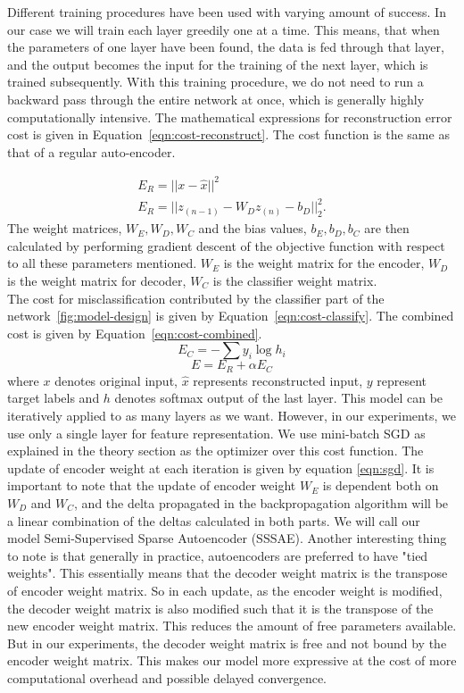 Different training procedures have been used with varying amount of success. In our case we will train each layer greedily one at a time. This means, that when the parameters of one layer have been found, the data is fed through that layer, and the output becomes the input for the training of the next layer, which is trained subsequently. With this training procedure, we do not need to run a backward pass through the entire network at once, which is generally highly computationally intensive. 
The mathematical expressions for reconstruction error cost is given in Equation~\ref{eqn:cost-reconstruct}. The cost function is the same as that of a regular auto-encoder. 

\begin{eqnarray}
\label{eqn:cost-reconstruct}
E_R = ||x - \hat{x}||^2   \\ 
E_{R} = ||z_{(n-1)} - W_{D}z_{(n)} -b_{D}||_{2}^{2}.
\end{eqnarray}
The weight matrices, $W_{E}, W_{D}, W_{C}$ and the bias values, $b_{E}, b_{D}, b_{C}$ are then calculated by performing gradient descent of the objective function with respect to all these parameters mentioned. $W_{E}$ is the weight matrix for the encoder, $W_{D}$ is the weight matrix for decoder, $W_{C}$ is the classifier weight matrix. \\
The cost for misclassification contributed by the classifier part of the network~\ref{fig:model-design} is given  by Equation~\ref{eqn:cost-classify}. The combined cost is given by Equation~\ref{eqn:cost-combined}. 
\begin{equation}
\label{eqn:cost-classify}
E_C = -\sum{y_{i}\log h_{i}}
\end{equation}
\begin{equation}
\label{eqn:cost-combined}
E = E_R + \alpha E_C
\end{equation}
where $x$ denotes original input, $\hat{x}$ represents reconstructed input, $y$ represent target labels and $h$ denotes softmax output of the last layer. This model can be iteratively applied to as many layers as we want. However, in our experiments, we use only a single layer for feature representation. We use mini-batch SGD as explained in the theory section as the optimizer over this cost function. The update of encoder weight at each iteration  is given by equation \ref{eqn:sgd}. It is important to note that the update of encoder weight $W_{E}$ is dependent both on $W_{D}$ and $W_{C}$, and the delta propagated in the backpropagation algorithm will be a linear combination of the deltas calculated in both parts. We will call our model Semi-Supervised Sparse Autoencoder (SSSAE). Another interesting thing to note is that generally in practice, autoencoders are preferred to have "tied weights". This essentially means that the decoder weight matrix is the transpose of encoder weight matrix. So in each update, as the encoder weight is modified, the decoder weight matrix is also modified such that it is the transpose of the new encoder weight matrix. This reduces the amount of free parameters available. But in our experiments, the decoder weight matrix is free and not bound by the encoder weight matrix. This makes our model more expressive at the cost of more computational overhead and possible delayed convergence.    \\
